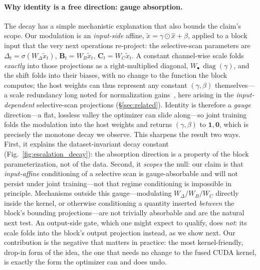 \documentclass{article}
\DeclareMathOperator{\diag}{diag}
\begin{document}
\paragraph{Why identity is a free direction: gauge absorption.}
The decay has a simple mechanistic explanation that also bounds the
claim's scope.  Our modulation is an \emph{input-side} affine,
$\tilde{x} = \gamma \odot \hat{x} + \beta$, applied to a block input that
the very next operations re-project: the selective-scan parameters are
$\Delta_t = \sigma(W_\Delta \tilde{x}_t)$, $\mathbf{B}_t = W_B \tilde{x}_t$,
$\mathbf{C}_t = W_C \tilde{x}_t$.  A constant channel-wise scale folds
\emph{exactly} into those projections as a right-multiplied diagonal,
$W_\bullet\,\diag(\gamma)$, and the shift folds into their biases, with no
change to the function the block computes; the host weights can thus
represent any constant $(\gamma,\beta)$ themselves---a scale redundancy long
noted for normalization gains~\citep{vanlaarhoven2017l2,hoffer2018norm}, here
arising in the \emph{input-dependent} selective-scan projections
(\S\ref{sec:related}).  Identity is therefore a
\emph{gauge} direction---a flat, lossless valley the optimizer can slide
along---so joint training folds the modulation into the host weights and
returns $(\gamma,\beta)$ to $\mathbf{1},\mathbf{0}$, which is precisely the
monotone decay we observe.  This sharpens the result two ways.  First, it
explains the dataset-invariant decay constant (Fig.~\ref{fig:escalation_decay}):
the absorption direction is a property of the block parameterization, not of
the data.  Second, it \emph{scopes} the null: our claim is that
\emph{input-affine} conditioning of a selective scan is gauge-absorbable and
will not persist under joint training---not that regime conditioning is
impossible in principle.  Mechanisms outside this gauge---modulating
$W_\Delta/W_B/W_C$ directly inside the kernel, or otherwise conditioning a
quantity inserted \emph{between} the block's bounding projections---are not
trivially absorbable and are the natural next test.  An output-side gate, which
one might expect to qualify, does \emph{not}: its scale folds into the block's
output projection instead, as we show next.  Our contribution is the negative
that matters in practice: the most kernel-friendly, drop-in form of the
idea, the one that needs no change to the fused CUDA kernel, is exactly the
form the optimizer can and does undo.
\end{document}
